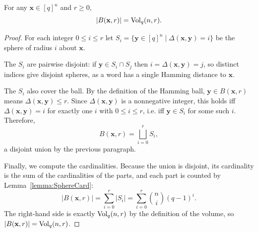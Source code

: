 \begin{lemma}
  \label{lemma:BallCard}
  \leanok
  For any $\mathbf{x} \in [q]^n$ and $r \geq 0$,
  \[|B(\mathbf{x}, r)| = \operatorname{Vol}_q(n, r).\]
\end{lemma}

\begin{proof}
  \leanok
  For each integer $0 \leq i \leq r$ let $S_i = \{\mathbf{y} \in [q]^n \mid \Delta(\mathbf{x}, \mathbf{y}) = i\}$
  be the sphere of radius $i$ about $\mathbf{x}$.

  The $S_i$ are pairwise disjoint: if $\mathbf{y} \in S_i \cap S_j$ then
  $i = \Delta(\mathbf{x}, \mathbf{y}) = j$, so distinct indices give disjoint spheres, as a word
  has a single Hamming distance to $\mathbf{x}$.

  The $S_i$ also cover the ball. By the definition of the Hamming ball,
  $\mathbf{y} \in B(\mathbf{x}, r)$ means $\Delta(\mathbf{x}, \mathbf{y}) \leq r$. Since
  $\Delta(\mathbf{x}, \mathbf{y})$ is a nonnegative integer, this holds iff
  $\Delta(\mathbf{x}, \mathbf{y}) = i$ for exactly one $i$ with $0 \leq i \leq r$, i.e. iff
  $\mathbf{y} \in S_i$ for some such $i$. Therefore,
  \[
    B(\mathbf{x}, r) = \bigsqcup_{i=0}^{r} S_i,
  \]
  a disjoint union by the previous paragraph.

  Finally, we compute the cardinalities. Because the union is disjoint, its cardinality is the sum of the
  cardinalities of the parts, and each part is counted by Lemma~\ref{lemma:SphereCard}:
  \[
    |B(\mathbf{x}, r)|
      = \sum_{i=0}^{r} |S_i|
      = \sum_{i=0}^{r} \binom{n}{i}(q-1)^i.
  \]
  The right-hand side is exactly $\operatorname{Vol}_q(n, r)$ by the definition of the volume, so
  $|B(\mathbf{x}, r)| = \operatorname{Vol}_q(n, r)$.
\end{proof}

